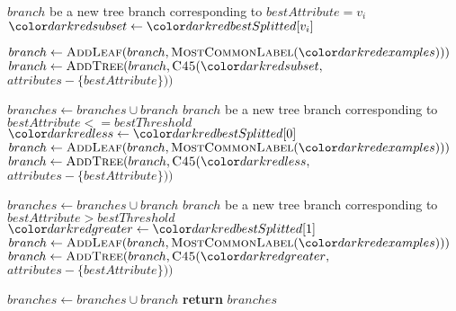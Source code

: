     \begin{algorithm}[H]
    \begin{algorithmic} [1]

           $branch$ {\small be a new tree branch corresponding to} $bestAttribute = v_i$
          \State $\red{subset} \gets \red{bestSplitted}[v_i]$

              \State $branch \gets \textsc{AddLeaf}(branch, \textsc{MostCommonLabel}(\red{examples})))$
          \Else
              \State $branch \gets \textsc{AddTree}(branch, \textsc{C45}(\red{subset},$ $attributes - \{bestAttribute\}))$\par\hfill
          \EndIf
          \State $branches \gets branches \cup branch$
      \EndFor
    \Else
       $branch$ {\small be a new tree branch corresponding to} $bestAttribute <= bestThreshold$
      \State $\red{less} \gets \red{bestSplitted}[0]$
          \State $branch \gets \textsc{AddLeaf}(branch, \textsc{MostCommonLabel}(\red{examples})))$
      \Else
          \State $branch \gets \textsc{AddTree}(branch, \textsc{C45}(\red{less},$ $attributes - \{bestAttribute\}))$\par\hfill
      \EndIf
      \State $branches \gets branches \cup branch$
       $branch$ {\small be a new tree branch corresponding to} $bestAttribute > bestThreshold$
      \State $\red{greater} \gets \red{bestSplitted}[1]$
          \State $branch \gets \textsc{AddLeaf}(branch, \textsc{MostCommonLabel}(\red{examples})))$
      \Else
          \State $branch \gets \textsc{AddTree}(branch, \textsc{C45}(\red{greater},$ $attributes - \{bestAttribute\}))$\par\hfill
      \EndIf
      \State $branches \gets branches \cup branch$
    \EndIf
    \State \textbf{return} $branches$
\EndProcedure
\end{algorithmic}
\end{algorithm}

